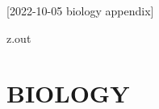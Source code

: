 [2022-10-05 biology appendix]

\begin{VerbatimOut}{z.out}
\chapter{BIOLOGY}

\end{VerbatimOut}

\MyIO
